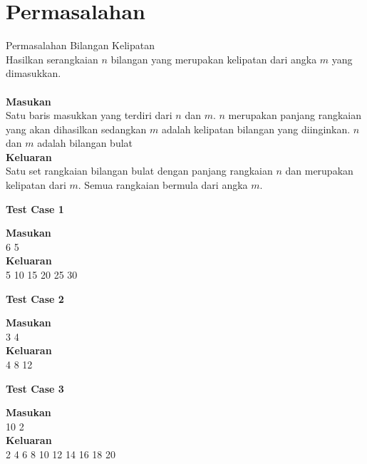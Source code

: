 \section{Permasalahan}
\begin{permasalahan}{Permasalahan Bilangan Kelipatan}\\
\label{prob:bilanganKelipatan}
	Hasilkan serangkaian $n$ bilangan yang merupakan kelipatan dari angka $m$ yang dimasukkan.\\\\
	\textbf{Masukan}\\
	Satu baris masukkan yang terdiri dari $n$ dan $m$. $n$ merupakan panjang rangkaian yang akan dihasilkan sedangkan $m$ adalah kelipatan bilangan yang diinginkan. $n$ dan $m$ adalah bilangan bulat\\
	\textbf{Keluaran}\\
	Satu set rangkaian bilangan bulat dengan panjang rangkaian $n$ dan merupakan kelipatan dari $m$. Semua rangkaian bermula dari angka $m$.\\
	\begin{center}
	\textbf{Test Case 1}\\
	\end{center}
	\textbf{Masukan}\\
	6 5\\
	\textbf{Keluaran}\\
	5 10 15 20 25 30 \\
	\begin{center}
	\textbf{Test Case 2}\\
	\end{center}
	\textbf{Masukan}\\
	3 4\\
	\textbf{Keluaran}\\
	4 8 12 \\
	\begin{center}
	\textbf{Test Case 3}\\
	\end{center}
	\textbf{Masukan}\\
	10 2\\
	\textbf{Keluaran}\\
	2 4 6 8 10 12 14 16 18 20\\
\end{permasalahan}


